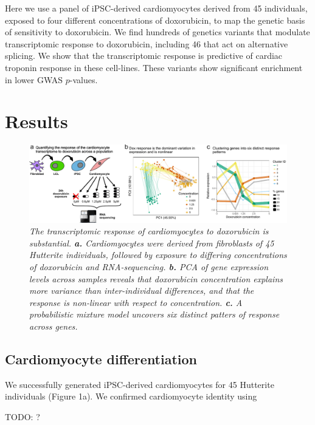 \documentclass{article}
\begin{document}
{Here we use a panel of iPSC-derived cardiomyocytes derived from 45 individuals, exposed to four different concentrations of doxorubicin, to map the genetic basis of sensitivity to doxorubicin. We find hundreds of genetics variants that modulate transcriptomic response to doxorubicin, including 46 that act on alternative splicing. We show that the transcriptomic response is predictive of cardiac troponin response in these cell-lines. These variants show significant enrichment in lower GWAS $p$-values. 

\section*{Results}

\begin{figure}
\begin{center}
    \includegraphics[width=1\textwidth]{../figures/fig1.pdf} %
    \caption{\it{The transcriptomic response of cardiomyocytes to doxorubicin is substantial. \textbf{a.} Cardiomyocytes were derived from fibroblasts of 45 Hutterite individuals, followed by exposure to differing concentrations of doxorubicin and RNA-sequencing. \textbf{b.} PCA of gene expression levels across samples reveals that doxorubicin concentration explains more variance than inter-individual differences, and that the response is non-linear with respect to concentration. \textbf{c.} A probabilistic mixture model uncovers six distinct patters of response across genes.}}
    \label{fig1}
    \end{center}
\end{figure}

\subsection*{Cardiomyocyte differentiation}

We successfully generated iPSC-derived cardiomyocytes for 45 Hutterite individuals (Figure 1a). We confirmed cardiomyocyte identity using 

TODO: ? 

}
\end{document}
